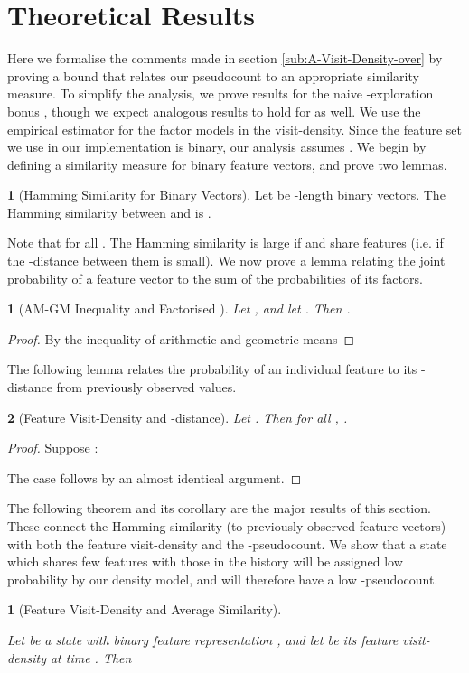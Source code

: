 \documentclass{article}
\theoremstyle{definition}
\newtheorem{defn}{\protect\definitionname}
\theoremstyle{definition}
\theoremstyle{plain}
\newtheorem{lem}{\protect\lemmaname}
\theoremstyle{plain}
\newtheorem{thm}{\protect\theoremname}
\theoremstyle{plain}
\providecommand{\definitionname}{Definition}
\providecommand{\lemmaname}{Lemma}
\providecommand{\theoremname}{Theorem}
\begin{document}
\section{Theoretical Results}

\noindent Here we formalise the comments made in section \ref{sub:A-Visit-Density-over}
by proving a bound that relates our pseudocount to an appropriate
similarity measure. To simplify the analysis, we prove results for
the naive -exploration bonus , though
we expect analogous results to hold for  as
well. We use the empirical estimator for the factor models in the
visit-density. Since the feature set we use in our implementation
is binary, our analysis assumes . We begin
by defining a similarity measure for binary feature vectors, and prove
two lemmas.
\begin{defn}[Hamming Similarity for Binary Vectors]
\noindent \label{df:l1similarity} Let 
be -length binary vectors. The Hamming similarity between 
and  is .
\end{defn}
\noindent Note that  for
all . The Hamming similarity
is large if  and  share features (i.e. if
the -distance between them is small). We now prove a lemma
relating the joint probability of a feature vector to the sum of the
probabilities of its factors.
\begin{lem}[AM-GM Inequality and Factorised ]
\noindent \label{lm:AMGM} Let , and let
.
Then .\end{lem}
\begin{proof}
By the inequality of arithmetic and geometric means  
\end{proof}
\noindent The following lemma relates the probability of an individual
feature to its -distance from previously observed values.
\begin{lem}[Feature Visit-Density and -distance]
\label{lm:comp_dist} Let \textup{.}
Then for all , \textup{.}\end{lem}
\begin{proof}
\noindent Suppose :

The  case follows by an almost identical argument. 
\end{proof}
\noindent The following theorem and its corollary are the major results
of this section. These connect the Hamming similarity (to previously
observed feature vectors) with both the feature visit-density and
the -pseudocount. We show that a state which shares few features
with those in the history will be assigned low probability by our
density model, and will therefore have a low -pseudocount.
\begin{thm}
[Feature Visit-Density and Average Similarity]\label{th:rhomaxsim}

\noindent Let  be a state with binary feature representation
, and let 
be its feature visit-density at time . Then 

\end{thm}
\end{document}
